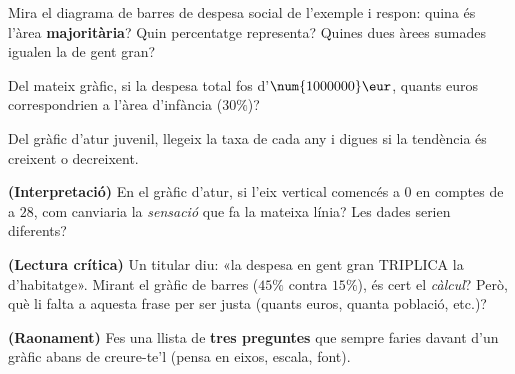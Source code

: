 \begin{exercicis}
\begin{exlist}
  \item Mira el diagrama de barres de despesa social de l'exemple i respon: quina és
        l'àrea \textbf{majoritària}? Quin percentatge representa? Quines dues àrees
        sumades igualen la de gent gran?
  \item Del mateix gràfic, si la despesa total fos d'$\num{1000000}\eur$, quants
        euros correspondrien a l'àrea d'infància ($30\%$)?
  \item Del gràfic d'atur juvenil, llegeix la taxa de cada any i digues si la
        tendència és creixent o decreixent.
  \item \textbf{(Interpretació)} En el gràfic d'atur, si l'eix vertical comencés a
        $0$ en comptes de a $28$, com canviaria la \emph{sensació} que fa la mateixa
        línia? Les dades serien diferents?
  \item \textbf{(Lectura crítica)} Un titular diu: «la despesa en gent gran TRIPLICA
        la d'habitatge». Mirant el gràfic de barres ($45\%$ contra $15\%$), és cert el
        \emph{càlcul}? Però, què li falta a aquesta frase per ser justa (quants euros,
        quanta població, etc.)?
  \item \textbf{(Raonament)} Fes una llista de \textbf{tres preguntes} que sempre
        faries davant d'un gràfic abans de creure-te'l (pensa en eixos, escala, font).
\end{exlist}
\end{exercicis}

